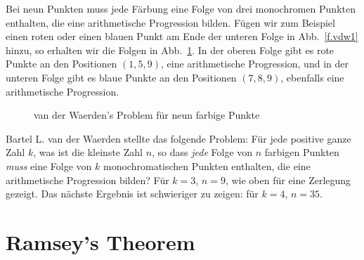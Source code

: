 Bei neun Punkten muss jede Färbung eine Folge von drei monochromen Punkten enthalten, die eine arithmetische Progression bilden. Fügen wir zum Beispiel einen roten oder einen blauen Punkt am Ende der unteren Folge in Abb.~\ref{f.vdw1} hinzu, so erhalten wir die Folgen in Abb.~\ref{f.vdw2}. In der oberen Folge gibt es rote Punkte an den Positionen $(1,5,9)$, eine arithmetische Progression, und in der unteren Folge gibt es blaue Punkte an den Positionen $(7,8,9)$, ebenfalls eine arithmetische Progression.
\begin{figure}[htb]
\begin{center}
\end{center}
\caption{van der Waerden's Problem für neun farbige Punkte}\label{f.vdw2}
\end{figure}
Bartel L. van der Waerden stellte das folgende Problem: Für jede positive ganze Zahl $k$, was ist die kleinste Zahl $n$, so dass \emph{jede} Folge von $n$ farbigen Punkten \emph{muss} eine Folge von $k$ monochromatischen Punkten enthalten, die eine arithmetische Progression bilden? Für $k=3$, $n=9$, wie oben für eine Zerlegung gezeigt. Das nächste Ergebnis ist schwieriger zu zeigen: für $k=4$, $n=35$.




\section{Ramsey's Theorem}\label{s.ramsey}

